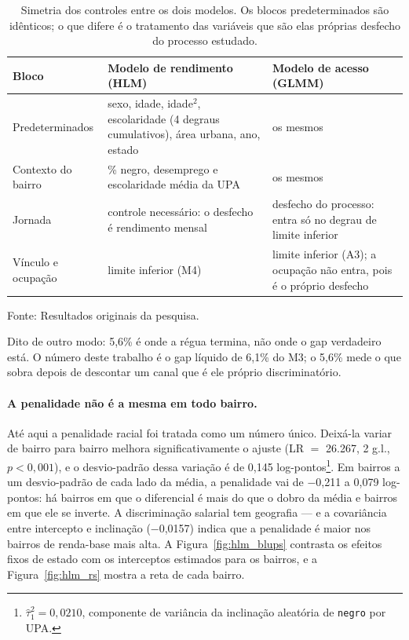 \documentclass[11pt, a4paper, oneside]{article}
\begin{document}
\begin{table}[!ht]
\centering
\caption{Simetria dos controles entre os dois modelos. Os blocos predeterminados são
idênticos; o que difere é o tratamento das variáveis que são elas próprias desfecho
do processo estudado.}
\label{tab:simetria}
\small
\begin{tabular}{p{3.4cm}p{4.6cm}p{4.6cm}}
\toprule
Bloco & Modelo de rendimento (HLM) & Modelo de acesso (GLMM) \\
\midrule
Predeterminados & sexo, idade, idade$^2$, escolaridade (4 degraus
cumulativos), área urbana, ano, estado & os mesmos \\
\addlinespace[3pt]
Contexto do bairro & \% negro, desemprego e escolaridade média da UPA & os mesmos \\
\addlinespace[3pt]
Jornada & controle necessário: o desfecho é rendimento mensal & desfecho do processo:
entra só no degrau de limite inferior \\
\addlinespace[3pt]
Vínculo e ocupação & limite inferior (M4) & limite inferior (A3); a ocupação não entra,
pois é o próprio desfecho \\
\bottomrule
\end{tabular}
\par\smallskip\footnotesize Fonte: Resultados originais da pesquisa.
\end{table}


\noindent Dito de outro modo: 5,6\% é onde a régua termina, não onde o gap
verdadeiro está. O número deste trabalho é o gap líquido de 6,1\% do M3; o
5,6\% mede o que sobra depois de descontar um canal que é ele próprio
discriminatório.

\paragraph{A penalidade não é a mesma em todo bairro.}
Até aqui a penalidade racial foi tratada como um número único. Deixá-la variar de bairro
para bairro melhora significativamente o ajuste (LR $=$ 26.267, 2 g.l.,
$p<0{,}001$), e o desvio-padrão dessa variação é de 0,145
log-pontos\footnote{$\hat\tau^2_1 = 0,0210$, componente de variância da inclinação
aleatória de \texttt{negro} por UPA.}. Em bairros a um desvio-padrão de cada lado da
média, a penalidade vai de −0,211 a 0,079 log-pontos: há bairros em que o
diferencial é mais do que o dobro da média e bairros em que ele se inverte. A
discriminação salarial tem geografia --- e a covariância entre intercepto e inclinação
(−0,0157) indica que a penalidade é maior nos bairros de renda-base
mais alta. A Figura~\ref{fig:hlm_blups} contrasta os efeitos fixos de estado com os
interceptos estimados para os bairros, e a Figura~\ref{fig:hlm_rs} mostra a reta de
cada bairro.
\end{document}

